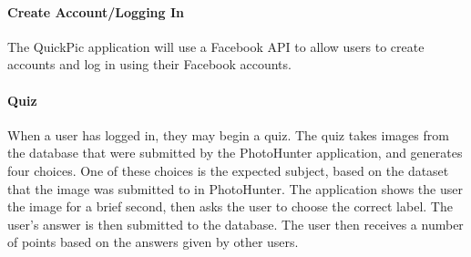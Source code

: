 \documentclass{article}
\begin{document}
\paragraph{Create Account/Logging In}
The QuickPic application will use a Facebook API to allow users to create
accounts and log in using their Facebook accounts.

\paragraph{Quiz}
When a user has logged in, they may begin a quiz. The quiz takes images from
the database that were submitted by the PhotoHunter application, and generates
four choices. One of these choices is the expected subject, based on the
dataset that the image was submitted to in PhotoHunter. The application shows
the user the image for a brief second, then asks the user to choose the correct
label. The user's answer is then submitted to the database. The user then
receives a number of points based on the answers given by other users.
\end{document}
